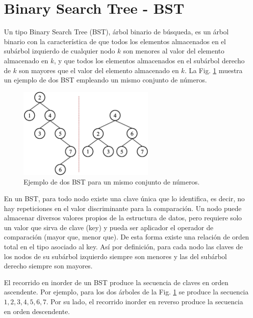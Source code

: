 \section{Binary Search Tree - BST}

Un tipo Binary Search Tree (BST), árbol binario de búsqueda, es un árbol binario con la característica de que todos los elementos almacenados en el subárbol izquierdo de cualquier nodo $k$ son menores al valor del elemento almacenado en $k$, y que todos los elementos almacenados en el subárbol derecho de $k$ son mayores que el valor del elemento almacenado en $k$. La Fig. \ref{fig:BSTExample1} muestra un ejemplo de dos BST empleando un mismo conjunto de números.

\begin{figure}[htpb!]
  \begin{center}
    \includegraphics[width=0.6\textwidth]{images/BSTExample1.eps}
  \end{center}
  \caption{Ejemplo de dos BST para un mismo conjunto de números.}
  \label{fig:BSTExample1}
\end{figure}

En un BST, para todo nodo existe una clave única que lo identifica, es decir, no hay repeticiones en el valor discriminante para la comparación. Un nodo puede almacenar diversos valores propios de la estructura de datos, pero requiere solo un valor que sirva de clave (key) y pueda ser aplicador el operador de comparación (mayor que, menor que). De esta forma existe una relación de orden total en el tipo asociado al key. Así por definición, para cada nodo las claves de los nodos de su subárbol izquierdo siempre son menores y las del subárbol derecho siempre son mayores.

El recorrido en inorder de un BST produce la secuencia de claves en orden ascendente. Por ejemplo, para los dos árboles de la Fig. \ref{fig:BSTExample1} se produce la secuencia $1, 2, 3, 4, 5, 6, 7$. Por su lado, el recorrido inorder en reverso produce la secuencia en orden descendente.

